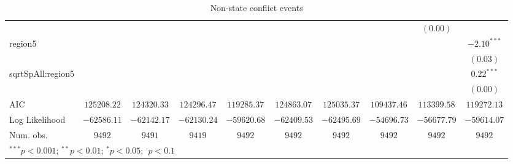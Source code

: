 \begin{sidewaystable}
\begin{center}
{\begin{tabular}{l c c c c c c c c c}
                  &               &               &               &               &               &               &               & $(0.00)$      &               \\
region5           &               &               &               &               &               &               &               &               & $-2.10^{***}$ \\
                  &               &               &               &               &               &               &               &               & $(0.03)$      \\
sqrtSpAll:region5 &               &               &               &               &               &               &               &               & $0.22^{***}$  \\
                  &               &               &               &               &               &               &               &               & $(0.00)$      \\
\midrule
AIC               & $125208.22$   & $124320.33$   & $124296.47$   & $119285.37$   & $124863.07$   & $125035.37$   & $109437.46$   & $113399.58$   & $119272.13$   \\
Log Likelihood    & $-62586.11$   & $-62142.17$   & $-62130.24$   & $-59620.68$   & $-62409.53$   & $-62495.69$   & $-54696.73$   & $-56677.79$   & $-59614.07$   \\
Num. obs.         & $9492$        & $9491$        & $9419$        & $9492$        & $9492$        & $9492$        & $9492$        & $9492$        & $9492$        \\
\bottomrule
\multicolumn{10}{l}{\scriptsize{$^{***}p<0.001$; $^{**}p<0.01$; $^{*}p<0.05$; $^{\cdot}p<0.1$}}
\end{tabular}
}
\caption{Non-state conflict events}
\label{znon_state}
\end{center}
\end{sidewaystable}
